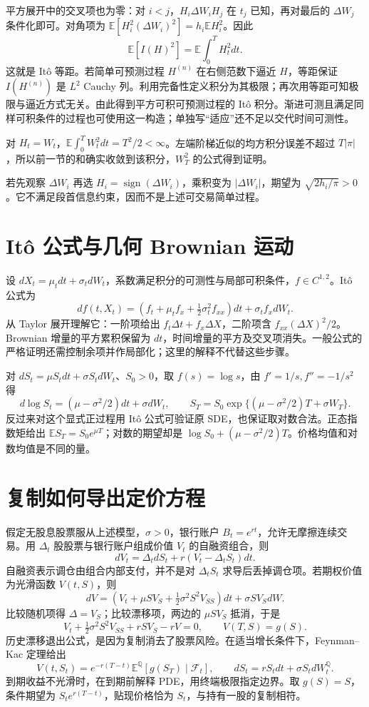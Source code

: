 平方展开中的交叉项也为零：对 $i<j$，$H_i\Delta W_iH_j$ 在 $t_j$ 已知，再对最后的 $\Delta W_j$ 条件化即可。对角项为 $\mathbb E[H_i^2(\Delta W_i)^2]=h_i\mathbb EH_i^2$。因此
\[
\mathbb E[I(H)^2]=\mathbb E\int_0^TH_t^2dt.
\]
这就是 Itô 等距。若简单可预测过程 $H^{(n)}$ 在右侧范数下逼近 $H$，等距保证 $I(H^{(n)})$ 是 $L^2$ Cauchy 列。利用完备性定义积分为其极限；再次用等距可知极限与逼近方式无关。由此得到平方可积可预测过程的 Itô 积分。渐进可测且满足同样可积条件的过程也可使用这一构造；单独写“适应”还不足以交代时间可测性。

对 $H_t=W_t$，$\mathbb E\int_0^TW_t^2dt=T^2/2<\infty$。左端阶梯近似的均方积分误差不超过 $T|\pi|$，所以前一节的和确实收敛到该积分，$W_T^2$ 的公式得到证明。

\begin{example}[看见未来会改变什么]
若先观察 $\Delta W_i$ 再选 $H_i=\operatorname{sign}(\Delta W_i)$，乘积变为 $|\Delta W_i|$，期望为 $\sqrt{2h_i/\pi}>0$。它不满足段首信息约束，因而不是上述可交易简单过程。
\end{example}

\section{Itô 公式与几何 Brownian 运动}
设 $dX_t=\mu_tdt+\sigma_tdW_t$，系数满足积分的可测性与局部可积条件，$f\in C^{1,2}$。Itô 公式为
\[
df(t,X_t)=\left(f_t+\mu_tf_x+\tfrac12\sigma_t^2f_{xx}\right)dt+\sigma_tf_xdW_t.
\]
从 Taylor 展开理解它：一阶项给出 $f_t\Delta t+f_x\Delta X$，二阶项含 $f_{xx}(\Delta X)^2/2$。Brownian 增量的平方累积保留为 $dt$，时间增量的平方及交叉项消失。一般公式的严格证明还需控制余项并作局部化；这里的解释不代替这些步骤。

对 $dS_t=\mu S_tdt+\sigma S_tdW_t$、$S_0>0$，取 $f(s)=\log s$，由 $f'=1/s,f''=-1/s^2$ 得
\[
d\log S_t=(\mu-\sigma^2/2)dt+\sigma dW_t,\qquad
S_T=S_0\exp\{(\mu-\sigma^2/2)T+\sigma W_T\}.
\]
反过来对这个显式正过程用 Itô 公式可验证原 SDE，也保证取对数合法。正态指数矩给出 $\mathbb ES_T=S_0e^{\mu T}$；对数的期望却是 $\log S_0+(\mu-\sigma^2/2)T$。价格均值和对数均值是不同的量。

\section{复制如何导出定价方程}
假定无股息股票服从上述模型，$\sigma>0$，银行账户 $B_t=e^{rt}$，允许无摩擦连续交易。用 $\Delta_t$ 股股票与银行账户组成价值 $V_t$ 的自融资组合，则
\[
dV_t=\Delta_tdS_t+r(V_t-\Delta_tS_t)dt.
\]
自融资表示调仓由组合内部支付，并不是对 $\Delta_tS_t$ 求导后丢掉调仓项。若期权价值为光滑函数 $V(t,S)$，则
\[
dV=(V_t+\mu SV_S+\tfrac12\sigma^2S^2V_{SS})dt+\sigma SV_SdW.
\]
比较随机项得 $\Delta=V_S$；比较漂移项，两边的 $\mu SV_S$ 抵消，于是
\[
V_t+\tfrac12\sigma^2S^2V_{SS}+rSV_S-rV=0,\qquad V(T,S)=g(S).
\]
历史漂移退出公式，是因为复制消去了股票风险。在适当增长条件下，Feynman--Kac 定理给出
\[
V(t,S_t)=e^{-r(T-t)}\mathbb E^{\mathbb Q}[g(S_T)\mid\mathcal F_t],
\qquad dS_t=rS_tdt+\sigma S_tdW_t^{\mathbb Q}.
\]
到期收益不光滑时，在到期前解释 PDE，用终端极限指定边界。取 $g(S)=S$，条件期望为 $S_te^{r(T-t)}$，贴现价格恰为 $S_t$，与持有一股的复制相符。

